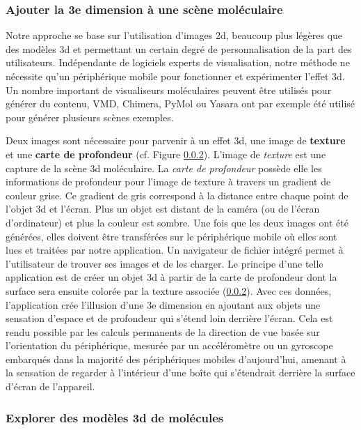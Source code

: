 \subsubsection{Ajouter la 3e dimension à une scène moléculaire}

Notre approche se base sur l'utilisation d'images 2d, beaucoup plus légères que des modèles 3d et permettant un certain degré de personnalisation de la part des utilisateurs. Indépendante de logiciels experts de visualisation, notre méthode ne nécessite qu'un périphérique mobile pour fonctionner et expérimenter l'effet 3d. Un nombre important de visualiseurs moléculaires peuvent être utilisés pour générer du contenu, VMD, Chimera, PyMol ou Yasara ont par exemple été utilisé pour générer plusieurs scènes exemples.

Deux images sont nécessaire pour parvenir à un effet 3d, une image de \textbf{texture} et une \textbf{carte de profondeur} (cf. Figure \ref{}). L'image de \textit{texture} est une capture de la scène 3d moléculaire. La \textit{carte de profondeur} possède elle les informations de profondeur pour l'image de texture à travers un gradient de couleur grise. Ce gradient de gris correspond à la distance entre chaque point de l'objet 3d et l'écran. Plus un objet est distant de la caméra (ou de l'écran d'ordinateur) et plus la couleur est sombre. Une fois que les deux images ont été générées, elles doivent être transférées sur le périphérique mobile où elles sont lues et traitées par notre application. Un navigateur de fichier intégré permet à l'utilisateur de trouver ses images et de les charger. Le principe d'une telle application est de créer un objet 3d à partir de la carte de profondeur dont la surface sera ensuite colorée par la texture associée (\ref{}). Avec ces données, l'application crée l'illusion d'une 3e dimension en ajoutant aux objets une sensation d'espace et de profondeur qui s'étend loin derrière l'écran. Cela est rendu possible par les calculs permanents de la direction de vue basée sur l'orientation du périphérique, mesurée par un accéléromètre ou un gyroscope embarqués dans la majorité des périphériques mobiles d'aujourd'hui, amenant à la sensation de regarder à l'intérieur d'une boîte qui s'étendrait derrière la surface d'écran de l'appareil.

\subsubsection{Explorer des modèles 3d de molécules}


